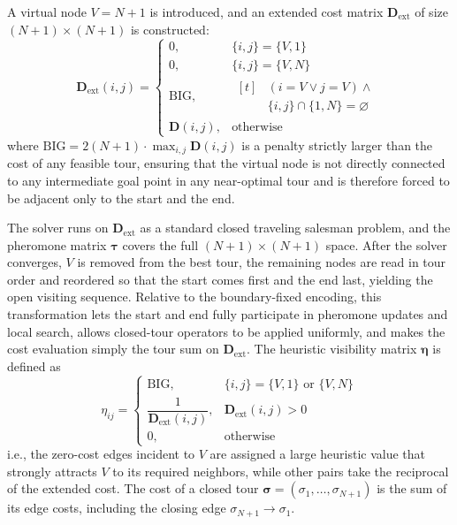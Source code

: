 \documentclass[lettersize,journal]{IEEEtran}
\begin{document}
A virtual node $V = N + 1$ is introduced, and an extended cost matrix $\mathbf{D}_{\mathrm{ext}}$ of size $(N+1) \times (N+1)$ is constructed:
\begin{equation}
\mathbf{D}_{\mathrm{ext}}(i, j) =
\begin{cases}
0, & \{i, j\} = \{V, 1\} \\
0, & \{i, j\} = \{V, N\} \\
\mathrm{BIG}, & \begin{aligned}[t]
& (i = V \lor j = V) \land \\
& \{i, j\} \cap \{1, N\} = \varnothing
\end{aligned} \\
\mathbf{D}(i, j), & \text{otherwise}
\end{cases}
\label{eq:dext}
\end{equation}
where $\mathrm{BIG} = 2(N+1) \cdot \max_{i,j} \mathbf{D}(i,j)$ is a penalty strictly larger than the cost of any feasible tour, ensuring that the virtual node is not directly connected to any intermediate goal point in any near-optimal tour and is therefore forced to be adjacent only to the start and the end.

The solver runs on $\mathbf{D}_{\mathrm{ext}}$ as a standard closed traveling salesman problem, and the pheromone matrix $\bm{\tau}$ covers the full $(N+1)\times(N+1)$ space. After the solver converges, $V$ is removed from the best tour, the remaining nodes are read in tour order and reordered so that the start comes first and the end last, yielding the open visiting sequence. Relative to the boundary-fixed encoding, this transformation lets the start and end fully participate in pheromone updates and local search, allows closed-tour operators to be applied uniformly, and makes the cost evaluation simply the tour sum on $\mathbf{D}_{\mathrm{ext}}$. The heuristic visibility matrix $\bm{\eta}$ is defined as
\begin{equation}
\eta_{ij} =
\begin{cases}
\mathrm{BIG}, & \{i, j\} = \{V, 1\} \text{ or } \{V, N\} \\
\dfrac{1}{\mathbf{D}_{\mathrm{ext}}(i,j)}, & \mathbf{D}_{\mathrm{ext}}(i,j) > 0 \\
0, & \text{otherwise}
\end{cases}
\label{eq:eta}
\end{equation}
i.e., the zero-cost edges incident to $V$ are assigned a large heuristic value that strongly attracts $V$ to its required neighbors, while other pairs take the reciprocal of the extended cost. The cost of a closed tour $\bm{\sigma} = (\sigma_1, \dots, \sigma_{N+1})$ is the sum of its edge costs, including the closing edge $\sigma_{N+1} \to \sigma_1$.
\end{document}
